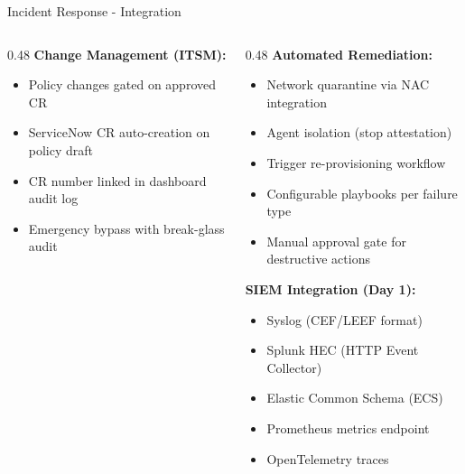 \begin{frame}{Incident Response - Integration}
\begin{columns}[T]
\begin{column}{0.48\textwidth}
      \textbf{Change Management (ITSM):}
      \begin{itemize}
        \setlength{\itemsep}{0pt}
        \item Policy changes gated on approved CR
        \item ServiceNow CR auto-creation on policy draft
        \item CR number linked in dashboard audit log
        \item Emergency bypass with break-glass audit
      \end{itemize}
    \end{column}
    \begin{column}{0.48\textwidth}
      \textbf{Automated Remediation:}
      \begin{itemize}
        \item Network quarantine via NAC integration
        \item Agent isolation (stop attestation)
        \item Trigger re-provisioning workflow
        \item Configurable playbooks per failure type
        \item Manual approval gate for destructive actions
      \end{itemize}

      \vspace{0.1cm}

      \textbf{SIEM Integration (Day 1):}
      \begin{itemize}
        \item Syslog (CEF/LEEF format)
        \item Splunk HEC (HTTP Event Collector)
        \item Elastic Common Schema (ECS)
        \item Prometheus metrics endpoint
        \item OpenTelemetry traces
      \end{itemize}
    \end{column}
  \end{columns}
\end{frame}
